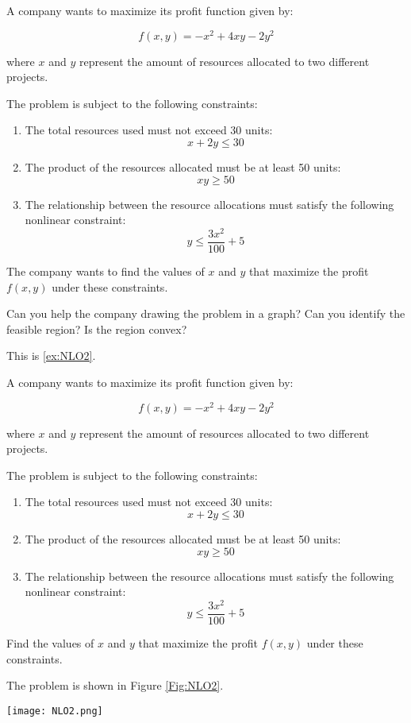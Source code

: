 \Exercise[label={ex:NLO2},title={coses}] 
A company wants to maximize its profit function given by:

\[
f(x, y) = -x^2 + 4xy - 2y^2
\]

where \(x\) and \(y\) represent the amount of resources allocated to two different projects.

The problem is subject to the following constraints:
\begin{enumerate}
    \item The total resources used must not exceed 30 units:
    \[
    x + 2y \leq 30
    \]
    \item The product of the resources allocated must be at least 50 units:
    \[
    xy \geq 50
    \]
    \item The relationship between the resource allocations must satisfy the following nonlinear constraint:
    \[
    y \leq \frac{3x^2}{100} + 5
    \]
\end{enumerate}

The company wants to find the values of \(x\) and \(y\) that maximize the profit \(f(x, y)\) under these constraints. 

Can you help the company drawing the problem in a graph? Can you identify the feasible region? Is the region convex?


\Answer 

This is \autoref{ex:NLO2}.

A company wants to maximize its profit function given by:

\[
f(x, y) = -x^2 + 4xy - 2y^2
\]

where \(x\) and \(y\) represent the amount of resources allocated to two different projects.

The problem is subject to the following constraints:
\begin{enumerate}
    \item The total resources used must not exceed 30 units:
    \[
    x + 2y \leq 30
    \]
    \item The product of the resources allocated must be at least 50 units:
    \[
    xy \geq 50
    \]
    \item The relationship between the resource allocations must satisfy the following nonlinear constraint:
    \[
    y \leq \frac{3x^2}{100} + 5
    \]
\end{enumerate}


Find the values of \(x\) and \(y\) that maximize the profit \(f(x, y)\) under these constraints.


The problem is shown in Figure \ref{Fig:NLO2}.

\begin{minipage}[t]{\linewidth}
  \vspace{-2ex}
        \texttt{[image: NLO2.png]}
    \label{Fig:NLO2}
\end{minipage}

\blacksquare